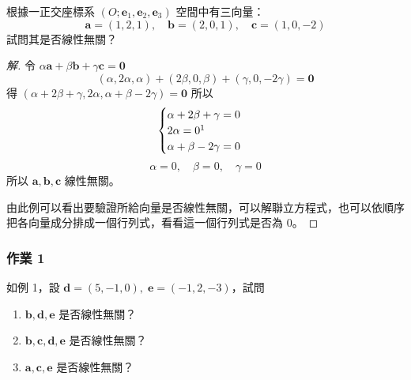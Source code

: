 \begin{example}[例 1]
根據一正交座標系 $(O; \mathbf{e}_1, \mathbf{e}_2, \mathbf{e}_3)$ 空間中有三向量：
\[ \mathbf{a} = (1, 2, 1),\quad \mathbf{b} = (2, 0, 1),\quad \mathbf{c} = (1, 0, -2) \]
試問其是否線性無關？
\end{example}
\begin{proof}[解]
令 $\alpha \mathbf{a} + \beta \mathbf{b} + \gamma \mathbf{c} = \mathbf{0}$
\[ (\alpha, 2\alpha, \alpha) + (2\beta, 0, \beta) + (\gamma, 0, -2\gamma) = \mathbf{0} \]
得 $(\alpha + 2\beta + \gamma, 2\alpha, \alpha + \beta - 2\gamma) = \mathbf{0}$
所以
\label{note:b3-ch5-p230-2alpha-typo}
\[ \begin{cases} \alpha + 2\beta + \gamma = 0 \\ 2\alpha = 0\footnotemark \\ \alpha + \beta - 2\gamma = 0 \end{cases} \]
\[ \alpha = 0,\quad \beta = 0,\quad \gamma = 0 \]
所以 $\mathbf{a}, \mathbf{b}, \mathbf{c}$ 線性無關。

由此例可以看出要驗證所給向量是否線性無關，可以解聯立方程式，也可以依順序把各向量成分排成一個行列式，看看這一個行列式是否為 0。
\end{proof}

\subsubsection*{作業 1}
如例 1，設 $\mathbf{d} = (5, -1, 0),\; \mathbf{e} = (-1, 2, -3)$，試問
\begin{enumerate}[label=(\roman*), leftmargin=2.5em]
  \item $\mathbf{b}, \mathbf{d}, \mathbf{e}$ 是否線性無關？
  \item $\mathbf{b}, \mathbf{c}, \mathbf{d}, \mathbf{e}$ 是否線性無關？
  \item $\mathbf{a}, \mathbf{c}, \mathbf{e}$ 是否線性無關？
\end{enumerate}

